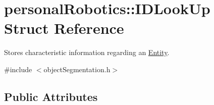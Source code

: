 \hypertarget{structpersonal_robotics_1_1_i_d_look_up}{}\section{personal\+Robotics\+:\+:I\+D\+Look\+Up Struct Reference}
\label{structpersonal_robotics_1_1_i_d_look_up}


Stores characteristic information regarding an \hyperlink{classpersonal_robotics_1_1_entity}{Entity}.  




{\ttfamily \#include $<$object\+Segmentation.\+h$>$}

\subsection*{Public Attributes}
